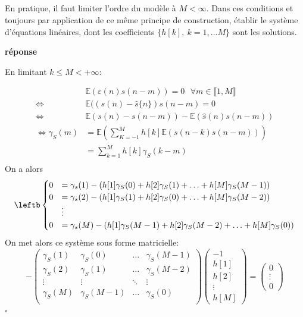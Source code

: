 \documentclass{article}
\newcommand{\debutrep}[1]{\color{blue}\begin{center} \hrulefill \textbf{ #1 } \hrulefill \end{center} }
\newcommand{\finrep}{\vspace*{5mm}\hfill $\square$\color{black}\vspace*{5mm}}
\begin{document}
\subsection{}
\label{eq.3} 
En pratique, il faut limiter  l'ordre du modèle à $M<\infty$. Dans ces conditions et toujours par application de ce même principe de construction, établir le système d'équations linéaires, dont les coefficients $\{h[k],~k=1,\ldots M\}$ sont les solutions.\\

\debutrep{réponse}
En limitant $k \leq M < +\infty$:

\[
\begin{split}
    & \mathbb{E}\left(\varepsilon(n) s(n-m)\right) = 0 \ \ \ \forall m \in \llbracket 1, M\rrbracket \\
    \Longleftrightarrow \ & \mathbb{E}( ( s(n)-\hat{s}\{n\})s(n-m) = 0 \\
    \Longleftrightarrow \ & \mathbb{E}(s(n) - s(n-m)) - \mathbb{E}(\hat{s}(n)s(n-m)) \\
    \Longleftrightarrow \gamma_S(m) &= \mathbb{E}\left(\sum_{K=-1}^M h[k]\mathbb{E}\left(s(n-k)s(n-m)\right)\right)\\
    &= \sum_{k=1}^M h[k] \gamma_S(k-m)\\
\end{split}
\]
On a alors
\[
\leftb
\begin{cases}
0 &= \gamma_s(1) - \left( h[1]\gamma_S(0) + h[2]\gamma_S(1) + \hdots + h[M]\gamma_S(M-1) \right)\\
0 &= \gamma_s(2) - \left( h[1]\gamma_S(1) + h[2]\gamma_S(0) + \hdots + h[M]\gamma_S(M-2) \right)\\
&\vdots\\
0 &= \gamma_s(M) - \left(h[1]\gamma_S(M-1) + h[2]\gamma_S(M-2) + \hdots + h[M]\gamma_S(0) \right)\\
\end{cases}
\]
On met alors ce système sous forme matricielle:
\[
-
\begin{pmatrix}
\gamma_S(1) & \gamma_S(0) & \hdots & \gamma_S(M-1) \\
\gamma_S(2) & \gamma_S(1) & \hdots & \gamma_S(M-2) \\
\vdots & \vdots & \ddots & \vdots \\
\gamma_S(M) & \gamma_S(M-1) & \hdots & \gamma_S(0) \\
\end{pmatrix}
\begin{pmatrix}
-1 \\ h[1] \\ h[2] \\ \vdots \\ h[M]
\end{pmatrix}
=
\begin{pmatrix}
0 \\ \vdots \\ 0
\end{pmatrix}
\]
\finrep
\end{document}
